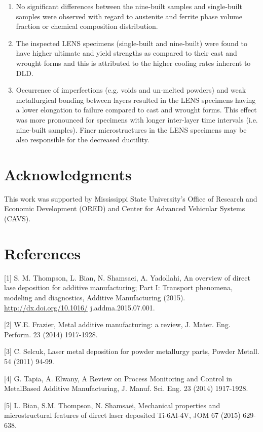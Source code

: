 \documentclass[10pt]{article}
\begin{document}
\begin{enumerate}
  \item No significant differences between the nine-built samples and single-built samples were observed with regard to austenite and ferrite phase volume fraction or chemical composition distribution.

  \item The inspected LENS specimens (single-built and nine-built) were found to have higher ultimate and yield strengths as compared to their cast and wrought forms and this is attributed to the higher cooling rates inherent to DLD.

  \item Occurrence of imperfections (e.g. voids and un-melted powders) and weak metallurgical bonding between layers resulted in the LENS specimens having a lower elongation to failure compared to cast and wrought forms. This effect was more pronounced for specimens with longer inter-layer time intervals (i.e. nine-built samples). Finer microstructures in the LENS specimens may be also responsible for the decreased ductility.

\end{enumerate}

\section*{Acknowledgments}
This work was supported by Mississippi State University's Office of Research and Economic Development (ORED) and Center for Advanced Vehicular Systems (CAVS).

\section*{References}
[1] S. M. Thompson, L. Bian, N. Shamsaei, A. Yadollahi, An overview of direct lase deposition for additive manufacturing; Part I: Transport phenomena, modeling and diagnostics, Additive Manufacturing (2015). \href{http://dx.doi.org/10.1016/}{http://dx.doi.org/10.1016/} j.addma.2015.07.001.

[2] W.E. Frazier, Metal additive manufacturing: a review, J. Mater. Eng. Perform. 23 (2014) 1917-1928.

[3] C. Selcuk, Laser metal deposition for powder metallurgy parts, Powder Metall. 54 (2011) 94-99.

[4] G. Tapia, A. Elwany, A Review on Process Monitoring and Control in MetalBased Additive Manufacturing, J. Manuf. Sci. Eng. 23 (2014) 1917-1928.

[5] L. Bian, S.M. Thompson, N. Shamsaei, Mechanical properties and microstructural features of direct laser deposited Ti-6Al-4V, JOM 67 (2015) 629-638.
\end{document}

